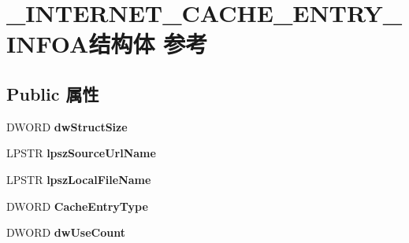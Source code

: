 \hypertarget{struct___i_n_t_e_r_n_e_t___c_a_c_h_e___e_n_t_r_y___i_n_f_o_a}{}\section{\+\_\+\+I\+N\+T\+E\+R\+N\+E\+T\+\_\+\+C\+A\+C\+H\+E\+\_\+\+E\+N\+T\+R\+Y\+\_\+\+I\+N\+F\+O\+A结构体 参考}
\label{struct___i_n_t_e_r_n_e_t___c_a_c_h_e___e_n_t_r_y___i_n_f_o_a}
\subsection*{Public 属性}
\begin{DoxyCompactItemize}
\item 
\mbox{\label{struct___i_n_t_e_r_n_e_t___c_a_c_h_e___e_n_t_r_y___i_n_f_o_a_aa55e4d8a033892dc20cd7e53d43a16fd}} 
D\+W\+O\+RD {\bfseries dw\+Struct\+Size}
\item 
\mbox{\label{struct___i_n_t_e_r_n_e_t___c_a_c_h_e___e_n_t_r_y___i_n_f_o_a_aac3e44ebcf80f83ae900ba4347f9529b}} 
L\+P\+S\+TR {\bfseries lpsz\+Source\+Url\+Name}
\item 
\mbox{\label{struct___i_n_t_e_r_n_e_t___c_a_c_h_e___e_n_t_r_y___i_n_f_o_a_a5cd377f39ee610f8236372e423e727ad}} 
L\+P\+S\+TR {\bfseries lpsz\+Local\+File\+Name}
\item 
\mbox{\label{struct___i_n_t_e_r_n_e_t___c_a_c_h_e___e_n_t_r_y___i_n_f_o_a_a9bdd22bd79f2dc42742f077ef78d4470}} 
D\+W\+O\+RD {\bfseries Cache\+Entry\+Type}
\item 
\mbox{\label{struct___i_n_t_e_r_n_e_t___c_a_c_h_e___e_n_t_r_y___i_n_f_o_a_a09e274a2432a66a82fb177da78088703}} 
D\+W\+O\+RD {\bfseries dw\+Use\+Count}
\item 
\mbox{\label{struct___i_n_t_e_r_n_e_t___c_a_c_h_e___e_n_t_r_y___i_n_f_o_a_a7edf870f10ff522276bf6194172d3ac7}} 

\end{DoxyCompactItemize}
